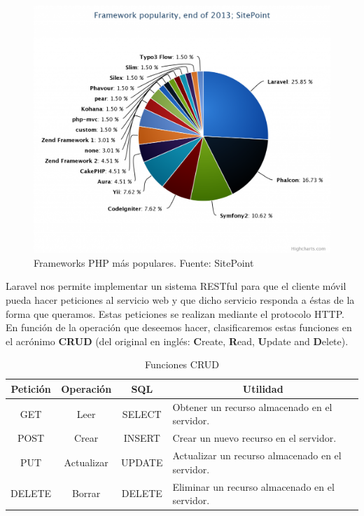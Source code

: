 \begin{figure}[H]
\centering
\includegraphics[keepaspectratio, scale=0.30]{Media/Captures/frameworkPopularity.png}
\caption{Frameworks PHP más populares. Fuente: SitePoint}
\label{fig:laravel5popularity}
\end{figure}

Laravel nos permite implementar un sistema RESTful para que el cliente móvil pueda hacer peticiones al servicio web y que dicho servicio responda a éstas de la forma que queramos. Estas peticiones se realizan mediante el protocolo HTTP. En función de la operación que deseemos hacer, clasificaremos estas funciones en el acrónimo \textbf{CRUD} \cite{ref:CRUD} (del original en inglés: \textbf{C}reate, \textbf{R}ead, \textbf{U}pdate and \textbf{D}elete).

\begin{table}[H]
\begin{tabular}{|c|c|c|m{6.25cm}|}
\hline
{\bf Petición} & {\bf Operación} & {\bf SQL} & \multicolumn{1}{c|}{{\bf Utilidad}}              \\ \hline
GET            & Leer            & SELECT    & Obtener un recurso almacenado en el servidor.    \\ \hline
POST           & Crear           & INSERT    & Crear un nuevo recurso en el servidor.           \\ \hline
PUT            & Actualizar      & UPDATE    & Actualizar un recurso almacenado en el servidor. \\ \hline
DELETE         & Borrar          & DELETE    & Eliminar un recurso almacenado en el servidor.   \\ \hline
\end{tabular}
\caption{Funciones CRUD}
\label{fig:CRUDtable}
\end{table}

